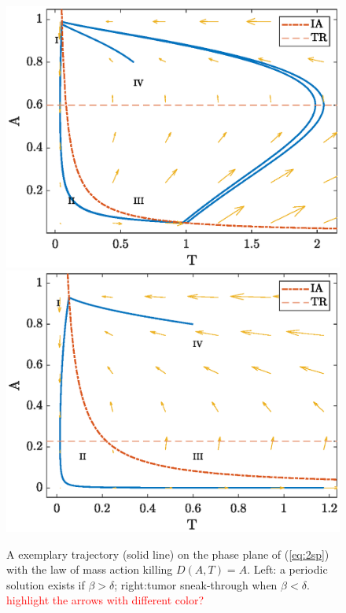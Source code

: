 \documentclass[review,authoryear]{elsarticle}
\newcommand{\red}[1]{\textcolor{red}{#1}}
\begin{document}
\begin{figure}
\centerline{\includegraphics[width=0.3\paperwidth]{figs/phase_plane_periodic_DA}\includegraphics[width=0.3\paperwidth]{figs/phase_plane_sneakthru_DA}}
\caption{A exemplary trajectory (solid line) on the phase plane of (\ref{eq:2sp}) with the law of mass action killing $D(A,T)=A$. Left: a periodic solution exists if $\beta>\delta$;
right:tumor sneak-through when $\beta<\delta$. \red{highlight the arrows with different color?}  \label{fig:PP-DA} }
\end{figure}
\end{document}
